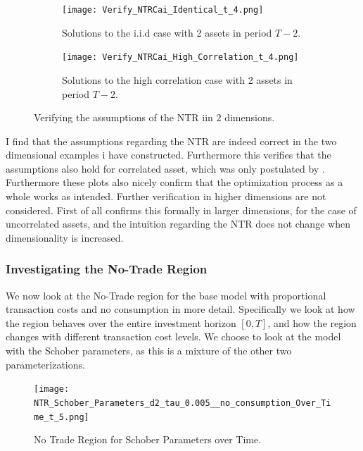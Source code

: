 \documentclass[11pt]{article}
\begin{document}
\begin{figure}[!ht]
    \centering
    \begin{subfigure}[t]{0.48\textwidth}
        \centering
        \texttt{[image: Verify\_NTRCai\_Identical\_t\_4.png]}
        \caption{Solutions to the i.i.d case with 2 assets in period $T-2$.}
        \label{fig:NTR_verify_iid}
    \end{subfigure}%
    \hfill
    \begin{subfigure}[t]{0.48\textwidth}
        \centering
        \texttt{[image: Verify\_NTRCai\_High\_Correlation\_t\_4.png]}
        \caption{Solutions to the high correlation case with 2 assets in period $T-2$.}
        \label{fig:NTR_verify_Correlation}
    \end{subfigure}

    \caption{Verifying the assumptions of the NTR iin $2$ dimensions.}
    \label{fig:NTR_Verify}
\end{figure}
I find that the assumptions regarding the \ac{NTR} are indeed correct in the two dimensional examples i have constructed.
Furthermore this verifies that the assumptions also hold for correlated asset, which was only postulated by \autocite{liu2002}.
Furthermore these plots also nicely confirm that the optimization process as a whole works as intended.
Further verification in higher dimensions are not considered. First of all \autocite{liu2002} confirms this formally in larger dimensions,
for the case of uncorrelated assets, and the intuition regarding the \ac{NTR} does not change when dimensionality is increased.

\subsubsection{Investigating the No-Trade Region} \label{Subsubsection: InvestigatingNTR}
We now look at the No-Trade region for the base model with proportional transaction costs and no consumption in more detail.
Specifically we look at how the region behaves over the entire investment horizon $[0, T]$, and how the region changes with different transaction cost levels.
We choose to look at the model with the Schober parameters, as this is a mixture of the other two parameterizations.

\begin{figure}[!ht]
    \centering
    \texttt{[image: NTR\_Schober\_Parameters\_d2\_tau\_0.005\_\_no\_consumption\_Over\_Time\_t\_5.png]}
    \caption{No Trade Region for Schober Parameters over Time.}
    \label{fig:NTR_2d_iid_standalone}
\end{figure}
\end{document}
